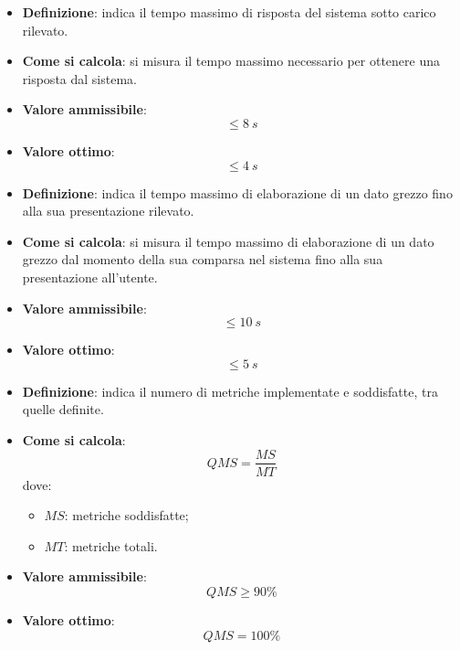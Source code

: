 \begin{itemize}
	\item \textbf{Definizione}: indica il tempo massimo di risposta del sistema sotto carico rilevato.
	\item \textbf{Come si calcola}: si misura il tempo massimo necessario per ottenere una risposta dal sistema.
	\item \textbf{Valore ammissibile}: \begin{equation*}\leq 8\ s\end{equation*}
	\item \textbf{Valore ottimo}: \begin{equation*}\leq 4\ s\end{equation*}
\end{itemize}

\begin{itemize}
	\item \textbf{Definizione}: indica il tempo massimo di elaborazione di un dato grezzo fino alla sua presentazione rilevato.
	\item \textbf{Come si calcola}: si misura il tempo massimo di elaborazione di un dato grezzo dal momento della sua comparsa nel sistema fino alla sua presentazione all'utente.
	\item \textbf{Valore ammissibile}: \begin{equation*}\leq 10\ s\end{equation*}
	\item \textbf{Valore ottimo}: \begin{equation*}\leq 5\ s\end{equation*}
\end{itemize}

\begin{itemize}
	\item \textbf{Definizione}: indica il numero di metriche implementate e soddisfatte, tra quelle definite.
	\item \textbf{Come si calcola}: \begin{equation*}QMS = \frac{MS}{MT}\end{equation*} dove:
		\begin{itemize}
			\item $MS$: metriche soddisfatte;
			\item $MT$: metriche totali.
		\end{itemize}
	\item \textbf{Valore ammissibile}: \begin{equation*}QMS \geq 90\%\end{equation*}
	\item \textbf{Valore ottimo}: \begin{equation*}QMS = 100\%\end{equation*}
\end{itemize}



